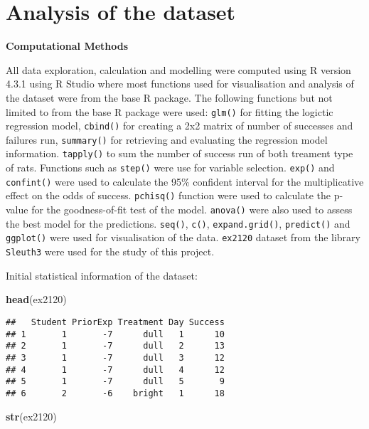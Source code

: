 \documentclass[
]{article}
\newenvironment{Shaded}{\begin{snugshade}}{\end{snugshade}}
\newcommand{\FunctionTok}[1]{\textcolor[rgb]{0.13,0.29,0.53}{\textbf{#1}}}
\newcommand{\NormalTok}[1]{#1}
\begin{document}
\hypertarget{analysis-of-the-dataset}{%
\section{Analysis of the dataset}\label{analysis-of-the-dataset}}

\textbf{Computational Methods}

All data exploration, calculation and modelling were computed using R
version 4.3.1 using R Studio where most functions used for visualisation
and analysis of the dataset were from the base R package. The following
functions but not limited to from the base R package were used:
\texttt{glm()} for fitting the logictic regression model,
\texttt{cbind()} for creating a 2x2 matrix of number of successes and
failures run, \texttt{summary()} for retrieving and evaluating the
regression model information. \texttt{tapply()} to sum the number of
success run of both treament type of rats. Functions such as
\texttt{step()} were use for variable selection. \texttt{exp()} and
\texttt{confint()} were used to calculate the 95\% confident interval
for the multiplicative effect on the odds of success. \texttt{pchisq()}
function were used to calculate the p-value for the goodness-of-fit test
of the model. \texttt{anova()} were also used to assess the best model
for the predictions. \texttt{seq()}, \texttt{c()},
\texttt{expand.grid()}, \texttt{predict()} and \texttt{ggplot()} were
used for visualisation of the data. \texttt{ex2120} dataset from the
library \texttt{Sleuth3} were used for the study of this project.

Initial statistical information of the dataset:

\begin{Shaded}
\begin{Highlighting}[]
\FunctionTok{head}\NormalTok{(ex2120)}
\end{Highlighting}
\end{Shaded}

\begin{verbatim}
##   Student PriorExp Treatment Day Success
## 1       1       -7      dull   1      10
## 2       1       -7      dull   2      13
## 3       1       -7      dull   3      12
## 4       1       -7      dull   4      12
## 5       1       -7      dull   5       9
## 6       2       -6    bright   1      18
\end{verbatim}

\begin{Shaded}
\begin{Highlighting}[]
\FunctionTok{str}\NormalTok{(ex2120)}
\end{Highlighting}
\end{Shaded}
\end{document}

